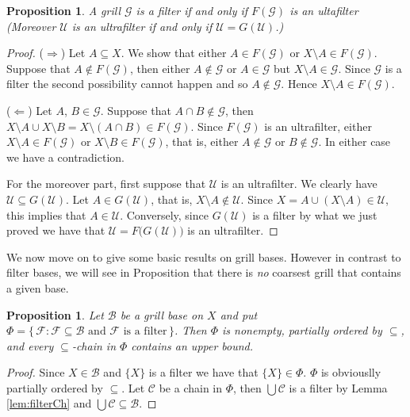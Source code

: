 \documentclass[12pt]{article}
\theoremstyle{plain}
\newtheorem{prop}[thm]{Proposition}
\theoremstyle{definition}
\newcommand{\calB}{\mathcal{B}}
\newcommand{\calC}{\mathcal{C}}
\newcommand{\calF}{\mathcal{F}}
\newcommand{\calG}{\mathcal{G}}
\newcommand{\calU}{\mathcal{U}}
\begin{document}
\begin{prop}
  A grill $\calG$ is a filter if and only if $F(\calG)$ is an
  ultafilter
  (Moreover $\calU$ is an ultrafilter if and only if $\calU =
  G(\calU)$.)
\end{prop}
\begin{proof}
  ($\Rightarrow$)
  Let $A \subseteq X$.
  We show that either $A \in F(\calG)$ or $X \setminus A \in
  F(\calG)$.
  Suppose that $A \not\in F(\calG)$, then either $A \not\in \calG$ or
  $A \in \calG$ but $X \setminus A \in \calG$.
  Since $\calG$ is a filter the second possibility cannot happen and
  so $A \not\in \calG$.
  Hence $X \setminus A \in F(\calG)$.

  ($\Leftarrow$)
  Let $A$, $B \in \calG$.
  Suppose that $A \cap B \not\in \calG$, then $X \setminus A \cup X
  \setminus B = X \setminus (A \cap B) \in F(\calG)$.
  Since $F(\calG)$ is an ultrafilter, either $X \setminus A \in
  F(\calG)$ or $X \setminus B \in F(\calG)$, that is, either $A
  \not\in \calG$ or $B \not\in \calG$.
  In either case we have a contradiction.
  
  For the moreover part, first suppose that $\calU$ is an ultrafilter.
  We clearly have $\calU \subseteq G(\calU)$.
  Let $A \in G(\calU)$, that is, $X \setminus A \not\in \calU$.
  Since $X = A \cup (X \setminus A) \in \calU$, this implies that $A
  \in \calU$.
  Conversely, since $G(\calU)$ is a filter by what we just proved we
  have that $\calU = F\bigl(G(\calU)\bigr)$ is an ultrafilter.
\end{proof}

We now move on to give some basic results on grill bases. 
However in contrast to filter bases, we will see in Proposition
 that there is
\textsl{no} coarsest grill that contains a given base.

\begin{prop}
  \label{prop:basePhi}
  Let $\calB$ be a grill base on $X$ and put $\Phi = \{\, \calF :
  \calF \subseteq \calB \mbox{ and } \calF \mbox{ is a filter} \,\}$.
  Then $\Phi$ is nonempty, partially ordered by $\subseteq$, and every
  \mbox{$\subseteq$-chain} in $\Phi$ contains an upper bound.
\end{prop}
\begin{proof}
  Since $X \in \calB$ and $\{X\}$ is a filter we have that $\{X\} \in
  \Phi$.
  $\Phi$ is obviouslly partially ordered by $\subseteq$.
  Let $\calC$ be a chain in $\Phi$, then $\bigcup\calC$ is a filter by
  Lemma \ref{lem:filterCh} and $\bigcup\calC \subseteq \calB$.
\end{proof}
\end{document}
